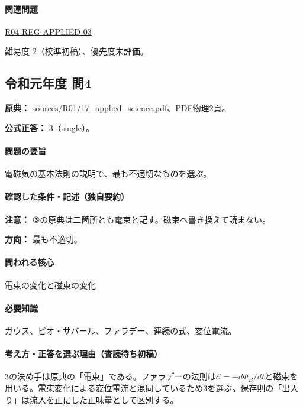 \paragraph{関連問題} \hyperref[q:r04-reg-applied-03]{R04-REG-APPLIED-03}

\par 難易度 2（校準初稿）、優先度未評価。

\subsection{令和元年度 問4}
\label{q:r01-reg-applied-04}

\noindent\textbf{原典：} sources/R01/17\_applied\_science.pdf、PDF物理2頁。

\textbf{公式正答：} 3（single）。

\paragraph{問題の要旨} 電磁気の基本法則の説明で、最も不適切なものを選ぶ。

\paragraph{確認した条件・記述（独自要約）}\mbox{}\par

\noindent\textbf{注意：} ③の原典は二箇所とも電束と記す。磁束へ書き換えて読まない。\par

\noindent\textbf{方向：} 最も不適切。\par

\paragraph{問われる核心} 電束の変化と磁束の変化

\paragraph{必要知識} ガウス、ビオ・サバール、ファラデー、連続の式、変位電流。

\paragraph{考え方・正答を選ぶ理由（査読待ち初稿）} 3の決め手は原典の「電束」である。ファラデーの法則は\(\mathcal E=-d\Phi_B/dt\)と磁束を用いる。電束変化による変位電流と混同しているため3を選ぶ。保存則の「出入り」は流入を正にした正味量として区別する。

